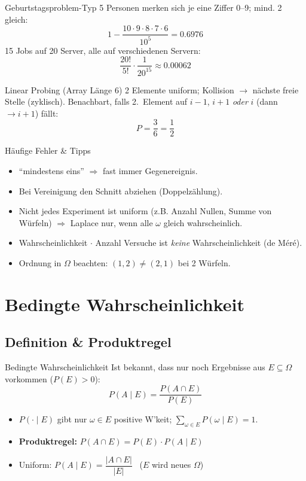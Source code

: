 \documentclass[a4paper, fontsize=7pt]{scrartcl}
\begin{document}
\begin{subbox}{Geburtstagsproblem-Typ}
5 Personen merken sich je eine Ziffer 0--9; mind. 2 gleich:
$$1 - \frac{10 \cdot 9 \cdot 8 \cdot 7 \cdot 6}{10^5} = 0.6976$$
15 Jobs auf 20 Server, alle auf verschiedenen Servern:
$$\frac{20!}{5!} \cdot \frac{1}{20^{15}} \approx 0.00062$$
\end{subbox}

\begin{subbox}{Linear Probing (Array Länge 6)}
2 Elemente uniform; Kollision $\to$ nächste freie Stelle (zyklisch).
Benachbart, falls 2.\ Element auf $i-1$, $i+1$ \emph{oder} $i$ (dann $\to i+1$)
fällt:
$$P = \frac{3}{6} = \frac{1}{2}$$
\end{subbox}

\begin{subbox}{Häufige Fehler \& Tipps}
\begin{itemize}
    \item ``mindestens eins'' $\Rightarrow$ fast immer Gegenereignis.
    \item Bei Vereinigung den Schnitt abziehen (Doppelzählung).
    \item Nicht jedes Experiment ist uniform (z.B. Anzahl Nullen, Summe von
          Würfeln) $\Rightarrow$ Laplace nur, wenn alle $\omega$ gleich
          wahrscheinlich.
    \item Wahrscheinlichkeit $\cdot$ Anzahl Versuche ist \emph{keine}
          Wahrscheinlichkeit (de Méré).
    \item Ordnung in $\Omega$ beachten: $(1,2) \neq (2,1)$ bei 2 Würfeln.
\end{itemize}
\end{subbox}

\section{Bedingte Wahrscheinlichkeit}

\subsection{Definition \& Produktregel}

\begin{mainbox}{Bedingte Wahrscheinlichkeit}
Ist bekannt, dass nur noch Ergebnisse aus $E \subseteq \Omega$ vorkommen
($P(E) > 0$):
$$\boxed{P(A \mid E) = \frac{P(A \cap E)}{P(E)}}$$
\begin{itemize}
    \item $P(\cdot \mid E)$ gibt nur $\omega \in E$ positive W'keit;
          $\sum_{\omega \in E} P(\omega \mid E) = 1$.
    \item \textbf{Produktregel:} $P(A \cap E) = P(E) \cdot P(A \mid E)$
    \item Uniform: $P(A \mid E) = \dfrac{|A \cap E|}{|E|}$ \ ($E$ wird
          neues $\Omega$)
\end{itemize}
\end{mainbox}
\end{document}
